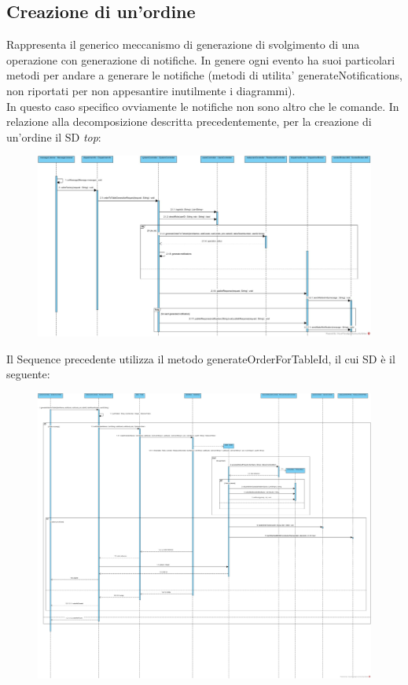\subsection{Creazione di un'ordine}
Rappresenta il generico meccanismo di generazione di svolgimento di una operazione con generazione di notifiche. In genere ogni evento ha suoi particolari metodi per andare a generare le notifiche (metodi di utilita' generateNotifications, non riportati per non appesantire inutilmente i diagrammi).
\\In questo caso specifico ovviamente le notifiche non sono altro che le comande.
In relazione alla decomposizione descritta precedentemente, per la creazione di un'ordine il SD \textit{top}:
 \begin{figure}[H]
 	\centering
 	\includegraphics[width=1\textwidth]{Immagini/top_orderToTableGenerationRequest.jpg}
 \end{figure}
Il Sequence precedente utilizza il metodo generateOrderForTableId, il cui SD è il seguente:
 \begin{figure}[H]
	\centering
	\includegraphics[width=1\textwidth]{Immagini/tableAndOrdersArea_generateOrderForTableId.jpg}
\end{figure}
